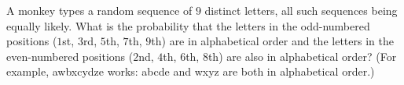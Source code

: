 A monkey types a random sequence of $9$ distinct letters, all such sequences being equally likely. What is the probability that the letters in the odd-numbered positions ($1$st, $3$rd, $5$th, $7$th, $9$th) are in alphabetical order and the letters in the even-numbered positions ($2$nd, $4$th, $6$th, $8$th) are also in alphabetical order? (For example, awbxcydze works: abcde and wxyz are both in alphabetical order.)
